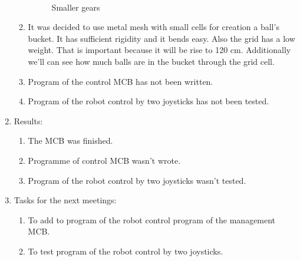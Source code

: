 \begin{enumerate}
\begin{enumerate}
		\begin{figure}[H]
		  \begin{minipage}[h]{0.2\linewidth}
			\center  
		  \end{minipage}
		  \begin{minipage}[h]{0.6\linewidth}
			\caption{Smaller gears}
		  \end{minipage}
		\end{figure}
		
		\item It was decided to use metal mesh with small cells for creation a ball's bucket. It has sufficient rigidity and it bends easy. Also the grid has a low weight. That is important because it will be rise to 120 cm. Additionally we'll can see how much balls are in the bucket through the grid cell.
		
		\item Program of the control MCB has not been written.
		
		\item Program of the robot control by two joysticks has not been tested.
		
	\end{enumerate}
	
	\item Results:
	\begin{enumerate}
		\item The MCB was finished.
		
		\item Programme of control MCB wasn't wrote.
		
		\item Program of the robot control by two joysticks wasn't tested.
		
	\end{enumerate}
	
	\item Tasks for the next meetings:
	\begin{enumerate}
		\item To add to program of the robot control program of the management MCB.
		
		\item To test program of the robot control by two joysticks.
		
	\end{enumerate}     
\end{enumerate}
\fillpage

